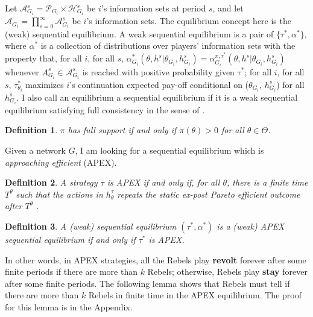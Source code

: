 \documentclass[12pt,letterpaper]{article}
\newtheorem{definition}{Definition}[section]
\theoremstyle{definition}
\theoremstyle{remark}
\theoremstyle{claim}
\begin{document}
Let $\mathcal{A}^s_{G_i}=\mathcal{P}_{G_i}\times \mathcal{H}^s_{G_i}$ be $i$'s information sets at period $s$, and let $\mathcal{A}_{G_i}=\prod^{\infty}_{s=0}\mathcal{A}^s_{G_i}$ be $i$'s information sets. The equilibrium concept here is the (weak) sequential equilibrium. A weak sequential equilibrium is a pair of $\{\tau^{*}, \alpha^{*}\}$, where $\alpha^{*}$ is a collection of distributions over players' information sets with the property that, for all $i$, for all $s$, $\alpha^{*}_{G_i}(\theta, h^{s}|\theta_{G_i},h^{s}_{G_i})=\alpha^{\pi,\tau^{*}}_{G_i}(\theta, h^{s}|\theta_{G_i},h^{s}_{G_i})$ whenever $A^s_{G_i}\in \mathcal{A}^{s}_{G_i}$ is reached with positive probability given $\tau^{*}$; for all $i$, for all $s$, $\tau^{*}_{\theta_i}$ maximizes $i$'s continuation expected pay-off conditional on ($\theta_{G_i}$, $h^{s}_{G_i}$) for all $h^{s}_{G_i}$. I also call an equilibrium a sequential equilibrium if it is a weak sequential equilibrium satisfying full consistency in the sense of \citep{Krep_Wilson1982}.

\begin{definition}
$\pi$ has full support if and only if $\pi(\theta)>0$ for all $\theta\in \Theta$.
\end{definition}

Given a network $G$, I am looking for a sequential equilibrium which is \textit{approaching efficient} (APEX). 

\begin{definition}
A strategy $\tau$ is APEX  if and only if, for all $\theta$, there is a finite time $T^{\theta}$ such that the actions in $h^{\tau}_{\theta}$ repeats the static ex-post Pareto efficient outcome after $T^{\theta}$ .
\end{definition}

\begin{definition}\label{Def_expost_efficient}
A (weak) sequential equilibrium $(\tau^{*},\alpha^{*})$ is a (weak) APEX sequential equilibrium if and only if $\tau^{*}$ is APEX.
\end{definition}

In other words, in APEX strategies, all the Rebels play \textbf{revolt} forever after some finite periods if there are more than $k$ Rebels; otherwise, Rebels play \textbf{stay} forever after some finite periods. The following lemma shows that Rebels must tell if there are more than $k$ Rebels in finite time in the APEX equilibrium. The proof for this lemma is in the Appendix.
\end{document}

